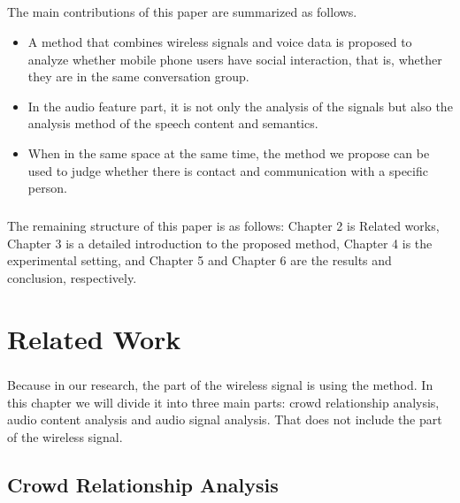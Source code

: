 \documentclass[a4paper,12pt]{report}
\begin{document}
\paragraph{}
The main contributions of this paper are summarized as follows.
\begin{itemize}
\item A method that combines wireless signals and voice data is proposed to analyze whether mobile phone users have social interaction, that is, whether they are in the same conversation group.
\item In the audio feature part, it is not only the analysis of the signals but also the analysis method of the speech content and semantics.
\item When in the same space at the same time, the method we propose can be used to judge whether there is contact and communication with a specific person.
\end{itemize}
\paragraph{}
The remaining structure of this paper is as follows: Chapter 2 is Related works, Chapter 3 is a detailed introduction to the proposed method, Chapter 4 is the experimental setting, and Chapter 5 and Chapter 6 are the results and conclusion, respectively.
\chapter{Related Work}
\paragraph{}
Because in our research, the part of the wireless signal is using the \cite{chen2019witrack} method. In this chapter we will divide it into three main parts: crowd relationship analysis, audio content analysis and audio signal analysis. That does not include the part of the wireless signal.
\section{Crowd Relationship Analysis}
\end{document}

